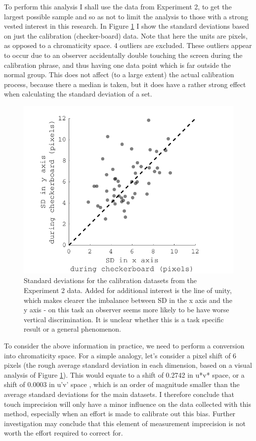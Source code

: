 To perform this analysis I shall use the data from Experiment 2, to get the largest possible sample and so as not to limit the analysis to those with a strong vested interest in this research. In Figure \ref{fig:BMtouch} I show the standard deviations based on just the calibration (checker-board) data. Note that here the units are pixels, as opposed to a chromaticity space. 4 outliers are excluded. These outliers appear to occur due to an observer accidentally double touching the screen during the calibration phrase, and thus having one data point which is far outside the normal group. This does not affect (to a large extent) the actual calibration process, because there a median is taken, but it does have a rather strong effect when calculating the standard deviation of a set.

\begin{figure}[hbtp]
\includegraphics[max width=\textwidth]{figs/tablet/BMtouch.pdf} 
\caption{Standard deviations for the calibration datasets from the Experiment 2 data. Added for additional interest is the line of unity, which makes clearer the imbalance between SD in the x axis and the y axis - on this task an observer seems more likely to be have worse vertical discrimination. It is unclear whether this is a task specific result or a general phenomenon.}
\label{fig:BMtouch}
\end{figure}

To consider the above information in practice, we need to perform a conversion into chromaticity space. For a simple analogy, let's consider a pixel shift of 6 pixels (the rough average standard deviation in each dimension, based on a visual analysis of Figure \ref{fig:BMtouch}). This would equate to a shift of 0.2742 in u*v* space, or a shift of 0.0003 in u'v' space %
, which is an order of magnitude smaller than the average standard deviations for the main datasets. I therefore conclude that touch imprecision will only have a minor influence on the data collected with this method, especially when an effort is made to calibrate out this bias. Further investigation may conclude that this element of measurement imprecision is not worth the effort required to correct for.


